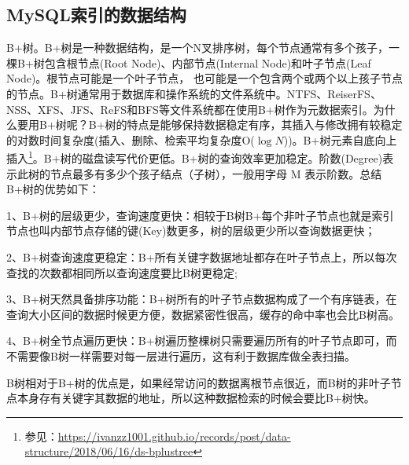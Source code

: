 \documentclass[../../../interview-questions.tex]{subfiles}
\begin{document}
\subsection{MySQL索引的数据结构}

B+树。B+树是一种数据结构，是一个N叉排序树，每个节点通常有多个孩子，一棵B+树包含根节点(Root Node)、内部节点(Internal Node)和叶子节点(Leaf Node)。根节点可能是一个叶子节点， 也可能是一个包含两个或两个以上孩子节点的节点。B+树通常用于数据库和操作系统的文件系统中。NTFS、ReiserFS、NSS、XFS、JFS、ReFS和BFS等文件系统都在使用B+树作为元数据索引。为什么要用B+树呢？B+树的特点是能够保持数据稳定有序，其插入与修改拥有较稳定的对数时间复杂度(插入、删除、检索平均复杂度O($\log N$))。B+树元素自底向上插入\footnote{参见：\url{https://ivanzz1001.github.io/records/post/data-structure/2018/06/16/ds-bplustree}}。B+树的磁盘读写代价更低。B+树的查询效率更加稳定。阶数(Degree)表示此树的节点最多有多少个孩子结点（子树），一般用字母 M 表示阶数。总结B+树的优势如下：

1、B+树的层级更少，查询速度更快：相较于B树B+每个非叶子节点也就是索引节点也叫内部节点存储的键(Key)数更多，树的层级更少所以查询数据更快；

2、B+树查询速度更稳定：B+所有关键字数据地址都存在叶子节点上，所以每次查找的次数都相同所以查询速度要比B树更稳定;

3、B+树天然具备排序功能：B+树所有的叶子节点数据构成了一个有序链表，在查询大小区间的数据时候更方便，数据紧密性很高，缓存的命中率也会比B树高。

4、B+树全节点遍历更快：B+树遍历整棵树只需要遍历所有的叶子节点即可，而不需要像B树一样需要对每一层进行遍历，这有利于数据库做全表扫描。

B树相对于B+树的优点是，如果经常访问的数据离根节点很近，而B树的非叶子节点本身存有关键字其数据的地址，所以这种数据检索的时候会要比B+树快。
\end{document}
